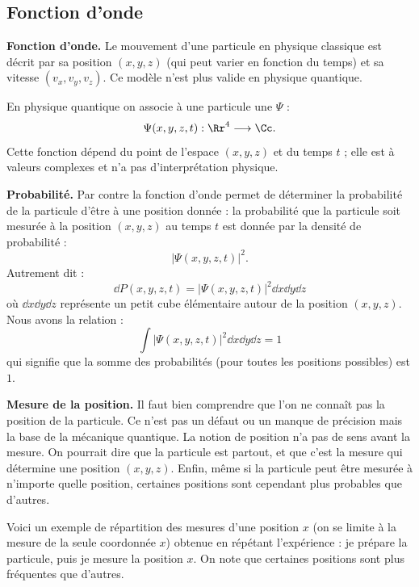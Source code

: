 \documentclass[11pt,class=report,crop=false]{standalone}
\begin{document}
\subsection{Fonction d'onde}

\textbf{Fonction d'onde.}
Le mouvement d'une particule en physique classique est décrit par sa position $(x,y,z)$ (qui peut varier en fonction du temps) et sa vitesse $(v_x,v_y,v_z)$. Ce modèle n'est plus valide en physique quantique.

En physique quantique on associe à une particule une  $\Psi$ :
$$\Psi(x,y,z,t) : \Rr^4 \longrightarrow \Cc.$$
Cette fonction dépend du point de l'espace $(x,y,z)$ et du temps $t$ ; elle est à valeurs complexes et n'a pas d'interprétation physique.

\bigskip

\textbf{Probabilité.}
Par contre la fonction d'onde permet de déterminer la probabilité de la particule d'être à une position donnée : la probabilité que la particule soit mesurée à la position $(x,y,z)$ au temps $t$ est donnée par la densité de probabilité :
$$\left| \Psi(x,y,z,t) \right|^2.$$
Autrement dit :
$$\dd P(x,y,z,t) = \left| \Psi(x,y,z,t) \right|^2 \dd x \dd y \dd z$$
où $\dd x \dd y \dd z$ représente un petit cube élémentaire autour de la position $(x,y,z)$.
Nous avons la relation :
$$\int \left| \Psi(x,y,z,t) \right|^2 \dd x \dd y \dd z = 1$$
qui signifie que la somme des probabilités (pour toutes les positions possibles) est $1$.

\bigskip

\textbf{Mesure de la position.}
Il faut bien comprendre que l'on ne connaît pas la position de la particule. Ce n'est pas un défaut ou un manque de précision mais la base de la mécanique quantique. 
La notion de position n'a pas de sens avant la mesure. On pourrait dire que la particule est \og{}partout\fg{}, et que c'est la mesure qui détermine une position $(x,y,z)$. 
Enfin, même si la particule peut être mesurée à n'importe quelle position, certaines positions sont cependant plus probables que d'autres.

Voici un exemple de répartition des mesures d'une position $x$ (on se limite à la mesure de la seule coordonnée $x$) obtenue en répétant l'expérience : je prépare la particule, puis je mesure la position $x$. On note que certaines positions sont plus fréquentes que d'autres.

\end{document}
